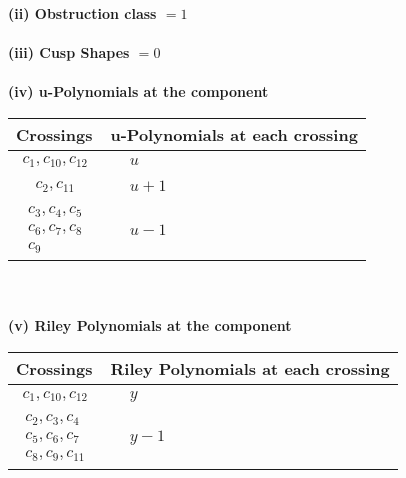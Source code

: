 \documentclass[1p]{elsarticle_modified}
\theoremstyle{definition}
\begin{document}
\flushleft \textbf{(ii) Obstruction class $= 1$}\\~\\
\flushleft \textbf{(iii) Cusp Shapes $= 0$}\\~\\
\newpage\renewcommand{\arraystretch}{1}
\flushleft \textbf{(iv) u-Polynomials at the component}\newline \\
\begin{tabular}{m{50pt}|m{274pt}}
Crossings & \hspace{64pt}u-Polynomials at each crossing \\
\hline $$\begin{aligned}c_{1},c_{10},c_{12}\end{aligned}$$&$\begin{aligned}
&u
\end{aligned}$\\
\hline $$\begin{aligned}c_{2},c_{11}\end{aligned}$$&$\begin{aligned}
&u+1
\end{aligned}$\\
\hline $$\begin{aligned}c_{3},c_{4},c_{5}\\c_{6},c_{7},c_{8}\\c_{9}\end{aligned}$$&$\begin{aligned}
&u-1
\end{aligned}$\\
\hline
\end{tabular}\\~\\
\newpage\renewcommand{\arraystretch}{1}
\flushleft \textbf{(v) Riley Polynomials at the component}\newline \\
\begin{tabular}{m{50pt}|m{274pt}}
Crossings & \hspace{64pt}Riley Polynomials at each crossing \\
\hline $$\begin{aligned}c_{1},c_{10},c_{12}\end{aligned}$$&$\begin{aligned}
&y
\end{aligned}$\\
\hline $$\begin{aligned}c_{2},c_{3},c_{4}\\c_{5},c_{6},c_{7}\\c_{8},c_{9},c_{11}\end{aligned}$$&$\begin{aligned}
&y-1
\end{aligned}$\\
\hline
\end{tabular}\\~\\
\end{document}
